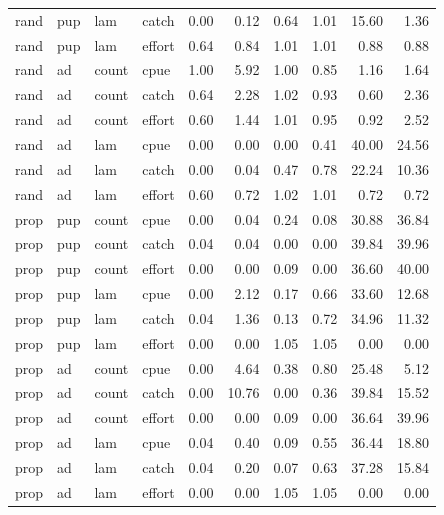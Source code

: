 \documentclass[nonumbib,leqno]{nrc1}
\begin{document}
\begin{longtable}{llllrrrrrr}
  rand & pup & lam & catch & 0.00 & 0.12 & 0.64 & 1.01 & 15.60 & 1.36 \\
  rand & pup & lam & effort & 0.64 & 0.84 & 1.01 & 1.01 & 0.88 & 0.88 \\
  rand & ad & count & cpue & 1.00 & 5.92 & 1.00 & 0.85 & 1.16 & 1.64 \\
  rand & ad & count & catch & 0.64 & 2.28 & 1.02 & 0.93 & 0.60 & 2.36 \\
  rand & ad & count & effort & 0.60 & 1.44 & 1.01 & 0.95 & 0.92 & 2.52 \\
  rand & ad & lam & cpue & 0.00 & 0.00 & 0.00 & 0.41 & 40.00 & 24.56 \\
  rand & ad & lam & catch & 0.00 & 0.04 & 0.47 & 0.78 & 22.24 & 10.36 \\
  rand & ad & lam & effort & 0.60 & 0.72 & 1.02 & 1.01 & 0.72 & 0.72 \\
  prop & pup & count & cpue & 0.00 & 0.04 & 0.24 & 0.08 & 30.88 & 36.84 \\
  prop & pup & count & catch & 0.04 & 0.04 & 0.00 & 0.00 & 39.84 & 39.96 \\
  prop & pup & count & effort & 0.00 & 0.00 & 0.09 & 0.00 & 36.60 & 40.00 \\
  prop & pup & lam & cpue & 0.00 & 2.12 & 0.17 & 0.66 & 33.60 & 12.68 \\
  prop & pup & lam & catch & 0.04 & 1.36 & 0.13 & 0.72 & 34.96 & 11.32 \\
  prop & pup & lam & effort & 0.00 & 0.00 & 1.05 & 1.05 & 0.00 & 0.00 \\
  prop & ad & count & cpue & 0.00 & 4.64 & 0.38 & 0.80 & 25.48 & 5.12 \\
  prop & ad & count & catch & 0.00 & 10.76 & 0.00 & 0.36 & 39.84 & 15.52 \\
  prop & ad & count & effort & 0.00 & 0.00 & 0.09 & 0.00 & 36.64 & 39.96 \\
  prop & ad & lam & cpue & 0.04 & 0.40 & 0.09 & 0.55 & 36.44 & 18.80 \\
  prop & ad & lam & catch & 0.04 & 0.20 & 0.07 & 0.63 & 37.28 & 15.84 \\
  prop & ad & lam & effort & 0.00 & 0.00 & 1.05 & 1.05 & 0.00 & 0.00 \\
   \hline
\end{longtable}

\pagebreak
\end{document}
